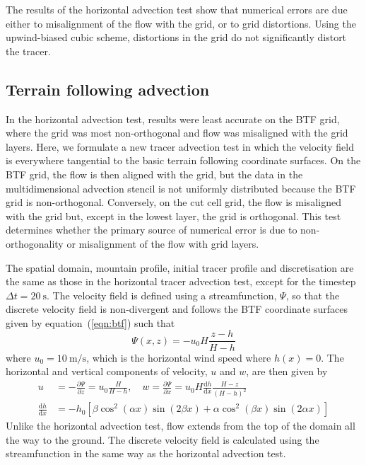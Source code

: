 \documentclass{ametsoc}
\begin{document}
The results of the horizontal advection test show that numerical errors are due either to misalignment of the flow with the grid, or to grid distortions.  Using the upwind-biased cubic scheme, distortions in the grid do not significantly distort the tracer.


\subsection{Terrain following advection}
In the horizontal advection test, results were least accurate on the BTF grid, where the grid was most non-orthogonal and flow was misaligned with the grid layers.  Here, we formulate a new tracer advection test in which the velocity field is everywhere tangential to the basic terrain following coordinate surfaces.
On the BTF grid, the flow is then aligned with the grid, but the data in the multidimensional advection stencil is not uniformly distributed because the BTF grid is non-orthogonal.
Conversely, on the cut cell grid, the flow is misaligned with the grid but, except in the lowest layer, the grid is orthogonal.
This test determines whether the primary source of numerical error is due to non-orthogonality or misalignment of the flow with grid layers.

The spatial domain, mountain profile, initial tracer profile and discretisation are the same as those in the horizontal tracer advection test, except for the timestep \(\Delta t = \SI{20}{\second}\).  The velocity field is defined using a streamfunction, $\Psi$, so that the discrete velocity field is non-divergent and follows the BTF coordinate surfaces given by equation~(\ref{eqn:btf}) such that
\begin{equation}
	\Psi(x,z) = -u_0 H \frac{z - h}{H - h} \label{eqn:streamfunc-btf}
\end{equation}
where $u_0 = \SI{10}{\meter\per\second}$, which is the horizontal wind speed where $h(x) = 0$.
The horizontal and vertical components of velocity, $u$ and $w$, are then given by
\begin{align}
	u &= -\frac{\partial \Psi}{\partial z} = u_0 \frac{H}{H - h}, \quad w = \frac{\partial \Psi}{\partial x} = u_0 H \frac{\mathrm{d} h}{\mathrm{d} x} \frac{H - z}{\left( H - h \right)^2} \label{eqn:uw-btf} \\
	\frac{\mathrm{d} h}{\mathrm{d} x} &= - h_0 \left[ 
		\beta \cos^2 \left( \alpha x \right) \sin \left( 2 \beta x \right) +
		\alpha \cos^2 \left( \beta x \right) \sin \left( 2 \alpha x \right)
	\right]
\end{align}
Unlike the horizontal advection test, flow extends from the top of the domain all the way to the ground.  The discrete velocity field is calculated using the streamfunction in the same way as the horizontal advection test.
\end{document}
